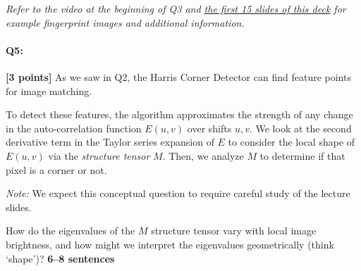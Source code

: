\documentclass[11pt]{article}
\begin{document}
\begin{enumerate}[(a)]
\begin{tcolorbox}[colback=orange!5!white,colframe=orange!75!black]
    \emph{Refer to the video at the beginning of Q3 and \href{http://biometrics.cse.msu.edu/Presentations/AnilJain_UniquenessOfFingerprints_NAS05.pdf}{the first 15 slides of this deck} for example fingerprint images and additional information.}
    \end{tcolorbox}


\end{enumerate}

\pagebreak




\pagebreak
\paragraph{Q5:} \textbf{[3 points]}
As we saw in Q2, the Harris Corner Detector can find feature points for image matching.

To detect these features, the algorithm approximates the strength of any change in the auto-correlation function $E(u, v)$ over shifts $u,v$. We look at the second derivative term in the Taylor series expansion of $E$ to consider the local shape of $E(u, v)$ via the \emph{structure tensor} $M$. Then, we analyze $M$ to determine if that pixel is a corner or not.

\textit{Note:} We expect this conceptual question to require careful study of the lecture slides.

\begin{tcolorbox}[colback=orange!5!white,colframe=orange!75!black]
How do the eigenvalues of the $M$ structure tensor vary with local image brightness, and how might we interpret the eigenvalues geometrically (think `shape')? \textbf{6--8 sentences}
\end{tcolorbox}

\end{document}
